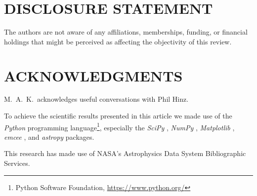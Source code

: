 \documentclass[letterpaper]{ar-1col}
\begin{document}
\lipsum[2-4]

\section*{DISCLOSURE STATEMENT}
The authors are not aware of any affiliations, memberships, funding, or financial holdings that
might be perceived as affecting the objectivity of this review.

\section*{ACKNOWLEDGMENTS}
M.\ A.\ K.\ acknowledges useful conversations with
Phil Hinz.


To achieve the scientific results presented in this article we made use of the \emph{Python} programming language\footnote{Python Software Foundation, \url{https://www.python.org/}}, especially the \emph{SciPy} \citep{virtanen2020}, \emph{NumPy} \citep{numpy}, \emph{Matplotlib} \citep{Matplotlib}, \emph{emcee} \citep{foreman-mackey2013}, and \emph{astropy} \citep{astropy_1,astropy_2} packages.
%

This research has made use of NASA's Astrophysics Data System Bibliographic Services.





\end{document}
